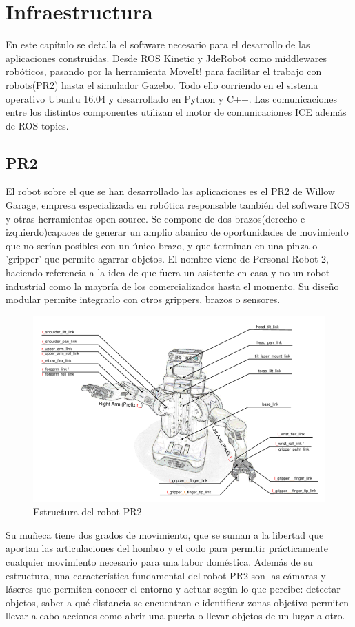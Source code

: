\documentclass[12pt,spanish,chapterprefix, numbers=noenddot]{book}
\numberwithin{equation}{section}
\numberwithin{figure}{section}
\begin{document}
\chapter{Infraestructura}
En este capítulo se detalla el software necesario para el desarrollo de las aplicaciones construidas. Desde ROS Kinetic y JdeRobot como middlewares robóticos, pasando por la herramienta MoveIt! para facilitar el trabajo con robots(PR2) hasta el simulador Gazebo. Todo ello corriendo en el sistema operativo Ubuntu 16.04 y desarrollado en Python y C++.  Las comunicaciones entre los distintos componentes utilizan el motor de comunicaciones ICE además de ROS topics. 
\section{PR2}
El robot sobre el que se han desarrollado las aplicaciones es el PR2 de Willow Garage, empresa especializada en robótica responsable también del software ROS y otras herramientas open-source. Se compone de dos brazos(derecho e izquierdo)capaces de generar un amplio abanico de oportunidades de movimiento que no serían posibles con un único brazo, y que terminan en una pinza o 'gripper' que permite agarrar objetos. El nombre viene de Personal Robot 2, haciendo referencia a la idea de que fuera un asistente en casa y no un robot industrial como la mayoría de los comercializados hasta el momento.
Su diseño modular permite integrarlo con otros grippers, brazos o sensores.
\begin{figure}[hbt!]
\centering
\includegraphics[width=12cm]{Figs/PR2_structure.png}
\par
\caption{\label{fig:pr2Structure}Estructura del robot PR2}
\end{figure}
Su muñeca tiene dos grados de movimiento, que se suman a la libertad que aportan las articulaciones del hombro y el codo para permitir prácticamente cualquier movimiento necesario para una labor doméstica.
Además de su estructura, una característica fundamental del robot PR2 son las cámaras y láseres que permiten conocer el entorno y actuar según lo que percibe: detectar objetos, saber a qué distancia se encuentran e identificar zonas objetivo permiten llevar a cabo acciones como abrir una puerta o llevar objetos de un lugar a otro.
\end{document}
